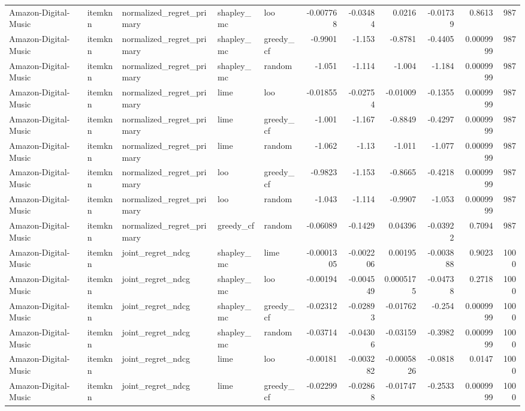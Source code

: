\begin{table}[t]
\begin{tabular}{lllllrrrrrr}
Amazon-Digital-Music & itemknn & normalized\_regret\_primary & shapley\_mc & loo & -0.007768 & -0.03484 & 0.0216 & -0.01739 & 0.8613 & 987 \\
Amazon-Digital-Music & itemknn & normalized\_regret\_primary & shapley\_mc & greedy\_cf & -0.9901 & -1.153 & -0.8781 & -0.4405 & 0.0009999 & 987 \\
Amazon-Digital-Music & itemknn & normalized\_regret\_primary & shapley\_mc & random & -1.051 & -1.114 & -1.004 & -1.184 & 0.0009999 & 987 \\
Amazon-Digital-Music & itemknn & normalized\_regret\_primary & lime & loo & -0.01855 & -0.02754 & -0.01009 & -0.1355 & 0.0009999 & 987 \\
Amazon-Digital-Music & itemknn & normalized\_regret\_primary & lime & greedy\_cf & -1.001 & -1.167 & -0.8849 & -0.4297 & 0.0009999 & 987 \\
Amazon-Digital-Music & itemknn & normalized\_regret\_primary & lime & random & -1.062 & -1.13 & -1.011 & -1.077 & 0.0009999 & 987 \\
Amazon-Digital-Music & itemknn & normalized\_regret\_primary & loo & greedy\_cf & -0.9823 & -1.153 & -0.8665 & -0.4218 & 0.0009999 & 987 \\
Amazon-Digital-Music & itemknn & normalized\_regret\_primary & loo & random & -1.043 & -1.114 & -0.9907 & -1.053 & 0.0009999 & 987 \\
Amazon-Digital-Music & itemknn & normalized\_regret\_primary & greedy\_cf & random & -0.06089 & -0.1429 & 0.04396 & -0.03922 & 0.7094 & 987 \\
Amazon-Digital-Music & itemknn & joint\_regret\_ndcg & shapley\_mc & lime & -0.0001305 & -0.002206 & 0.00195 & -0.003888 & 0.9023 & 1000 \\
Amazon-Digital-Music & itemknn & joint\_regret\_ndcg & shapley\_mc & loo & -0.00194 & -0.004549 & 0.0005175 & -0.04738 & 0.2718 & 1000 \\
Amazon-Digital-Music & itemknn & joint\_regret\_ndcg & shapley\_mc & greedy\_cf & -0.02312 & -0.02893 & -0.01762 & -0.254 & 0.0009999 & 1000 \\
Amazon-Digital-Music & itemknn & joint\_regret\_ndcg & shapley\_mc & random & -0.03714 & -0.04306 & -0.03159 & -0.3982 & 0.0009999 & 1000 \\
Amazon-Digital-Music & itemknn & joint\_regret\_ndcg & lime & loo & -0.00181 & -0.003282 & -0.0005826 & -0.0818 & 0.0147 & 1000 \\
Amazon-Digital-Music & itemknn & joint\_regret\_ndcg & lime & greedy\_cf & -0.02299 & -0.02868 & -0.01747 & -0.2533 & 0.0009999 & 1000 \\

\end{tabular}
\end{table}
